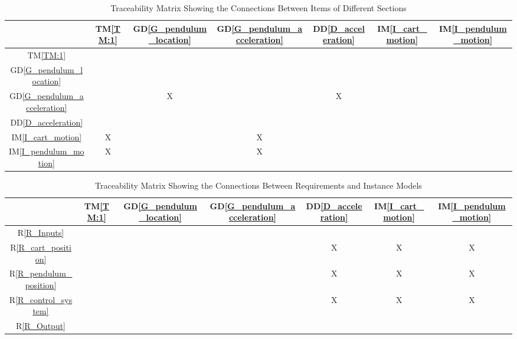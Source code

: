 \documentclass[12pt]{article}
\newcommand{\dref}[1]{GD\ref{#1}}
\newcommand{\ddref}[1]{DD\ref{#1}}
\newcommand{\tref}[1]{TM\ref{#1}}
\newcommand{\iref}[1]{IM\ref{#1}}
\newcommand{\rref}[1]{R\ref{#1}}
\begin{document}
\begin{table}[h!]
\centering
\begin{tabular}{|c|c|c|c|c|c|c|}
\hline
	& \tref{TM:1}& \dref{G_pendulum_location}& \dref{G_pendulum_acceleration}& \ddref{D_acceleration}& \iref{I_cart_motion}& \iref{I_pendulum_motion} \\
\hline
\tref{TM:1}                       & & & & & & \\ \hline
\dref{G_pendulum_location}        & & & & & & \\ \hline
\dref{G_pendulum_acceleration}    & &X& &X& & \\ \hline
\ddref{D_acceleration}            & & & & & & \\ \hline
\iref{I_cart_motion}              &X& &X& & & \\ \hline
\iref{I_pendulum_motion}          &X& &X& & & \\
\hline
\end{tabular}
\caption{Traceability Matrix Showing the Connections Between Items of Different Sections}
\label{Table:trace}
\end{table}

\begin{table}[h!]
\centering
\begin{tabular}{|c|c|c|c|c|c|c|}
\hline
	& \tref{TM:1}& \dref{G_pendulum_location}& \dref{G_pendulum_acceleration}& \ddref{D_acceleration}& \iref{I_cart_motion}& \iref{I_pendulum_motion} \\
\hline
\rref{R_Inputs}              & & & & & & \\ \hline
\rref{R_cart_position}       & & & &X&X&X\\ \hline
\rref{R_pendulum_position}   & & & &X&X&X\\ \hline
\rref{R_control_system}      & & & &X&X&X\\ \hline
\rref{R_Output}              & & & & & & \\
\hline
\end{tabular}
\caption{Traceability Matrix Showing the Connections Between Requirements and Instance Models}
\label{Table:R_trace}
\end{table}

\end{document}
